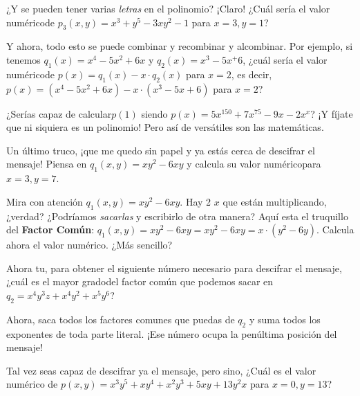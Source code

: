 \documentclass{article}
\begin{document}
¿Y se pueden tener varias \textit{letras} en el polinomio? ¡Claro! ¿Cuál sería el valor numérico\footnotemark[1] de $p_3(x,y) = x^3+y^5-3xy^2-1$ para $x=3,y=1$?




Y ahora,  todo esto se puede combinar y recombinar y alcombinar.
%
Por ejemplo, si tenemos $q_1(x) = x^4-5x^2+6x$ y $q_2(x) = x^3-5x^+6$, ¿cuál sería el valor numérico\footnotemark[1] de $p(x) = q_1(x) - x\cdot q_2(x)$ para $x=2$, es decir, $p(x) = (x^4-5x^2+6x) - x\cdot (x^3-5x+6)$ para $x=2$?



\quad

¿Serías capaz de calcular\footnotemark[1] $p(1)$ siendo $p(x) = 5 x^{150} + 7x^{75} - 9x-2x^{x}$? ¡Y fíjate que ni siquiera es un polinomio! Pero así de versátiles son las matemáticas.



Un último truco, ¡que me quedo sin papel y ya estás cerca de descifrar el mensaje!
%
Piensa en $q_1(x,y) = xy^2-6xy$ y calcula su valor numérico\footnotemark[1] para $x=3,y=7$.



Mira con atención $q_1(x,y) = xy^2-6xy$. Hay 2 $x$ que están multiplicando, ¿verdad? ¿Podríamos \textit{sacarlas} y escribirlo de otra manera?
%
Aquí esta el truquillo del \textbf{Factor Común}:
%
$q_1(x,y) = xy^2-6xy = xy^2-6xy = x\cdot (y^2-6y)$. 
%
Calcula ahora el valor numérico.
%
¿Más sencillo?

Ahora tu, para obtener el siguiente número necesario para descifrar el mensaje, ¿cuál es el mayor grado\footnotemark[1] del factor común que podemos sacar en
$q_2 = x^4y^3z + x^4y^2 + x^5y^6$?



Ahora, saca todos los factores comunes que puedas de $q_2$
y suma todos los exponentes de toda parte literal. ¡Ese número ocupa la penúltima posición del mensaje!


Tal vez seas capaz de descifrar ya el mensaje, pero sino, ¿Cuál es el valor numérico \footnotemark[1] de $p(x,y) = x^3y^5 + xy^4+x^2y^3+5xy+13y^2x$ para $x=0,y=13$?


\end{document}
